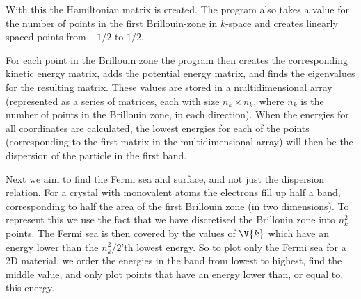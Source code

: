 \documentclass[main.tex]{subfiles}
\begin{document}
	With this the Hamiltonian matrix is created. The program also takes a value for the number of points in the first Brillouin-zone in $ k $-space and creates linearly spaced points from $ -1/2 $ to $ 1/2 $.
	
	For each point in the Brillouin zone the program then creates the corresponding kinetic energy matrix, adds the potential energy matrix, and finds the eigenvalues for the resulting matrix. These values are stored in a multidimensional array (represented as a series of matrices, each with size $ n_k \times n_k $, where $ n_k $ is the number of points in the Brillouin zone, in each direction). When the energies for all coordinates are calculated, the lowest energies for each of the points (corresponding to the first matrix in the multidimensional array) will then be the dispersion of the particle in the first band.
	
	Next we aim to find the Fermi sea and surface, and not just the dispersion relation. For a crystal with monovalent atoms the electrons fill up half a band, corresponding to half the area of the first Brillouin zone (in two dimensions). To represent this we use the fact that we have discretised the Brillouin zone into $ n_k^2 $ points. The Fermi sea is then covered by the values of $ \V{k} $ which have an energy lower than the $ n_k^2/2 $'th lowest energy. So to plot only the Fermi sea for a 2D material, we order the energies in the band from lowest to highest, find the middle value, and only plot points that have an energy lower than, or equal to, this energy.
	
\end{document}
